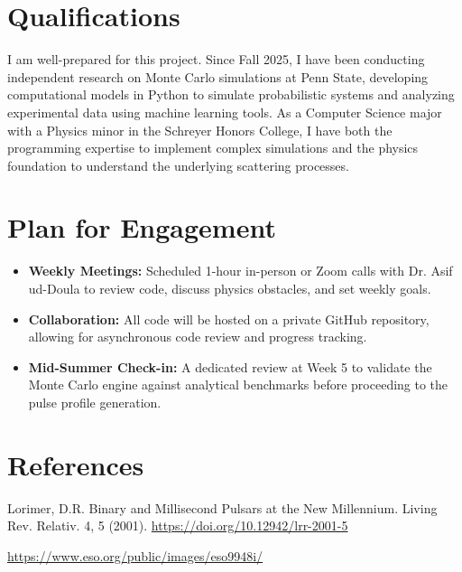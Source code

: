 \documentclass[11pt]{article}
\begin{document}
\section*{Qualifications}
I am well-prepared for this project. Since Fall 2025, I have been conducting independent research on Monte Carlo simulations at Penn State, developing computational models in Python to simulate probabilistic systems and analyzing experimental data using machine learning tools. As a Computer Science major with a Physics minor in the Schreyer Honors College, I have both the programming expertise to implement complex simulations and the physics foundation to understand the underlying scattering processes.


\section*{Plan for Engagement}
\begin{itemize}[label=\textbullet]
    \item \textbf{Weekly Meetings:} Scheduled 1-hour in-person or Zoom calls with Dr. Asif ud-Doula to review code, discuss physics obstacles, and set weekly goals.
    \item \textbf{Collaboration:} All code will be hosted on a private GitHub repository, allowing for asynchronous code review and progress tracking.
    \item \textbf{Mid-Summer Check-in:} A dedicated review at Week 5 to validate the Monte Carlo engine against analytical benchmarks before proceeding to the pulse profile generation.
\end{itemize}

\section*{References}
\noindent Lorimer, D.R. Binary and Millisecond Pulsars at the New Millennium. Living Rev. Relativ. 4, 5 (2001). \url{https://doi.org/10.12942/lrr-2001-5}

\noindent \url{https://www.eso.org/public/images/eso9948i/}
\end{document}
